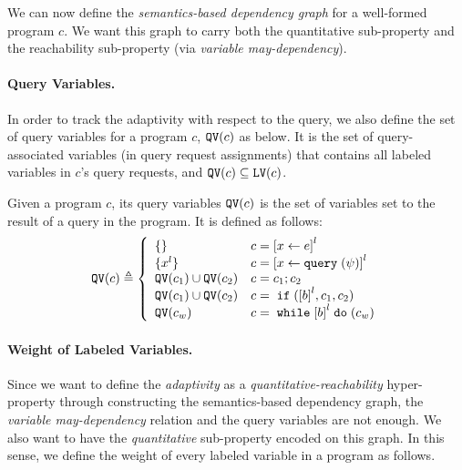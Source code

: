 We can now define the \emph{semantics-based dependency graph} for a well-formed program $c$. We want this graph to carry both the quantitative sub-property and the reachability sub-property (via \emph{variable may-dependency}). 

\paragraph{Query Variables.}
In order to track the adaptivity with respect to the query,
we also define the set of query variables for a program $c$, $\mathtt{QV}(c)$ as below.
It is the set of query-associated variables (in query request assignments) that contains all labeled variables in $c$'s query requests, and $\mathtt{QV}(c) \subseteq \mathtt{LV}(c)$.
\begin{defn} 
 \label{def:qvar}
Given a program $c$, its query variables 
$\mathtt{QV}(c)$ is the set of variables set to the result of a query in the program.
It is defined as follows:
{
\[
 \qvar(c) \triangleq
 \left\{
 \begin{array}{ll}
 \{\} 
 & {c} = \clabel{\assign x \expr}^{l} 
 \\
 \{{x}^l\} 
 & {c} = \clabel{\assign x \query(\qexpr)}^{l} 
 \\
 \qvar(c_1) \cup \qvar(c_2) 
 & {c} = {c_1};{c_2}
 \\
 \qvar(c_1) \cup \qvar(c_2) 
 & {c} =\eif(\clabel{\bexpr}^{l}, c_1, c_2) 
 \\
 \qvar(c_w)
 & {c} = \ewhile \clabel{\bexpr}^{l} \edo (c_w)
\end{array}
\right.
\]
}
\end{defn}
%

\paragraph{Weight of Labeled Variables.}
Since we want to define the \emph{adaptivity} as a \emph{quantitative-reachability} hyper-property through constructing the semantics-based dependency graph,
the \emph{variable may-dependency} relation and the query variables are not enough.
We also want to have the \emph{quantitative} sub-property encoded on this graph.
In this sense, we define 
the weight of
every labeled variable in a program as follows.


